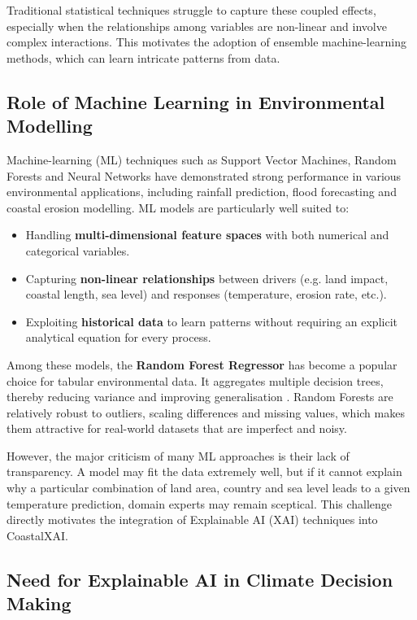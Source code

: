 \documentclass[12pt, a4paper]{article}
\begin{document}
Traditional statistical techniques struggle to capture these coupled
effects, especially when the relationships among variables are
non-linear and involve complex interactions. This motivates the adoption
of ensemble machine-learning methods, which can learn intricate
patterns from data.

\subsection{\textbf{Role of Machine Learning in Environmental Modelling}}

Machine-learning (ML) techniques such as Support Vector Machines,
Random Forests and Neural Networks have demonstrated strong
performance in various environmental applications, including rainfall
prediction, flood forecasting and coastal erosion modelling. ML models
are particularly well suited to:
\begin{itemize}
  \item Handling \textbf{multi-dimensional feature spaces} with both
  numerical and categorical variables.
  \item Capturing \textbf{non-linear relationships} between drivers
  (e.g. land impact, coastal length, sea level) and responses
  (temperature, erosion rate, etc.).
  \item Exploiting \textbf{historical data} to learn patterns without
  requiring an explicit analytical equation for every process.
\end{itemize}

Among these models, the \textbf{Random Forest Regressor} has become a
popular choice for tabular environmental data. It aggregates multiple
decision trees, thereby reducing variance and improving generalisation
\cite{breiman2001}. Random Forests are relatively robust to outliers,
scaling differences and missing values, which makes them attractive for
real-world datasets that are imperfect and noisy.

However, the major criticism of many ML approaches is their lack of
transparency. A model may fit the data extremely well, but if it
cannot explain why a particular combination of land area, country and
sea level leads to a given temperature prediction, domain experts may
remain sceptical. This challenge directly motivates the integration of
Explainable AI (XAI) techniques into CoastalXAI.

\subsection{\textbf{Need for Explainable AI in Climate Decision Making}}
\end{document}
